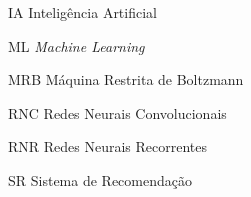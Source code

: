 \begin{siglas}
  \item[IA] Inteligência Artificial
  \item[ML] \textit{Machine Learning}
  \item[MRB] Máquina Restrita de Boltzmann
  \item[RNC] Redes Neurais Convolucionais
  \item[RNR] Redes Neurais Recorrentes
  \item[SR] Sistema de Recomendação
\end{siglas}
